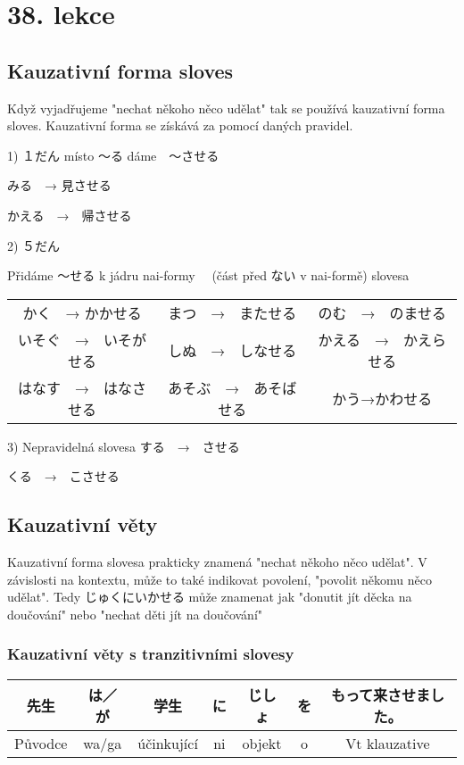 \section{38. lekce}
\label{sec:lekce_38}

\subsection{Kauzativní forma sloves}

Když vyjadřujeme "nechat někoho něco udělat" tak se používá kauzativní forma sloves. Kauzativní forma se získává za pomocí daných pravidel.

1) １だん
místo 〜る dáme　〜させる

みる　→ 見させる

かえる　→　帰させる


2) ５だん

Přidáme 〜せる k jádru nai-formy 　(část před ない v nai-formě) slovesa

\begin{center}
\begin{tabular}{ccc}
かく　→ かかせる&まつ　→　またせる&のむ　→　のませる\\
いそぐ　→　いそがせる&しぬ　→　しなせる&かえる　→　かえらせる\\
はなす　→　はなさせる&あそぶ　→　あそばせる&かう→かわせる\\
\end{tabular}
\end{center}



3) Nepravidelná slovesa
する　→　させる

くる　→　こさせる

\subsection{Kauzativní věty}
Kauzativní forma slovesa prakticky znamená "nechat někoho něco udělat". V závislosti na kontextu, může to také indikovat povolení, "povolit někomu něco udělat". Tedy じゅくにいかせる může znamenat jak "donutit jít děcka na doučování" nebo "nechat děti jít na doučování"

\subsubsection{Kauzativní věty s tranzitivními slovesy}

\begin{center}
\begin{tabular}{||c|c||c|c||c|c||c||}
\hline
先生&は／が&学生&に&じしょ&を&もって来させました。\\
\hline
Původce&wa/ga&účinkující&ni&objekt&o&Vt klauzative\\
\hline
\end{tabular}
\end{center}

